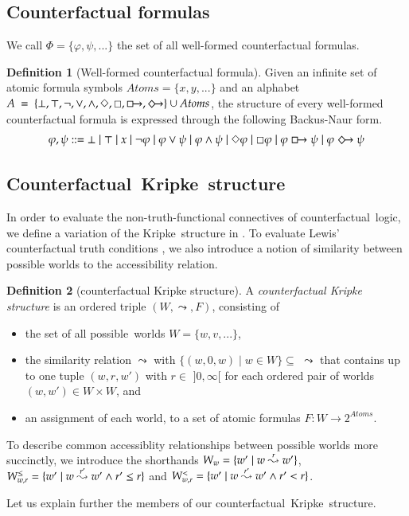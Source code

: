 \documentclass[a4paper,american,10pt]{paper}
\theoremstyle{definition}\newtheorem{definition}{Definition}
\begin{document}
\subsection{Counterfactual formulas}
We call $\Phi = \{\varphi ,\psi ,...\}$ the set of all well-formed counterfactual formulas.
\begin{definition}[Well-formed counterfactual formula]
Given an infinite set of atomic formula symbols $Atoms = \{ x, y, ...\}$ and an alphabet $A~=~\{\bot ,\top ,\neg ,\vee ,\wedge ,\Diamond ,\Box ,\boxright ,\Diamondright\}\cup Atoms$, the structure of every well-formed counterfactual formula is expressed through the following Backus-Naur form.
\begin{equation}
\varphi, \psi ::= \bot \mid \top \mid x \mid \neg \varphi \mid \varphi \vee \psi \mid \varphi \wedge \psi \mid \Diamond \varphi \mid \Box \varphi \mid \varphi \boxright \psi \mid \varphi \Diamondright \psi
\end{equation}
\end{definition}

\subsection{Counterfactual~Kripke~structure}
In order to evaluate the non-truth-functional connectives of counterfactual~logic, we define a variation of the Kripke~structure in \cite{kripke_modal_logic_1963}. To evaluate Lewis' counterfactual truth conditions \cite{lewis_counterfactuals_1973}, we also introduce a notion of similarity between possible worlds to the accessibility relation.
\begin{definition}[counterfactual Kripke structure]
A {\it counterfactual Kripke structure} is an ordered triple $(W, \leadsto ,F)$, consisting of
\begin{itemize}
\item the set of all possible~worlds $W=\{w,v,...\}$,
\item the similarity relation $\leadsto$ with $\{(w,0,w)\mid w\in W\}\subseteq$ $\leadsto$ that contains up to one tuple $(w, r, w')$ with $r\in$ $]0,\infty [$ for each ordered pair of worlds $(w,w')\in W\times W$, and
\item an assignment of each world, to a set of atomic formulas $F \colon W \rightarrow 2^{Atoms}$.
\end{itemize}
To describe common accessiblity relationships between possible worlds more succinctly, we introduce the shorthands $W_w = \{w'\mid \smash{w \overset{r}{\leadsto} w'}\}$, $W_{w,r}^\leq = \{w'\mid \smash{w \overset{r'}{\leadsto} w'}\wedge r'\leq r\}$ and $W_{w,r}^< = \{w'\mid \smash{w \overset{r'}{\leadsto} w'}\wedge r'< r\}$.
\end{definition}
\noindent Let us explain further the members of our counterfactual~Kripke~structure.
\end{document}
